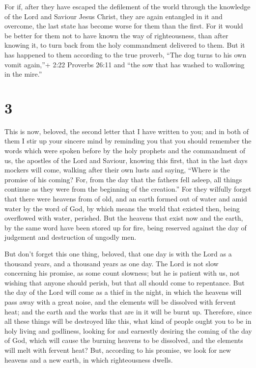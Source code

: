  For if, after they have escaped the defilement of the
world through the knowledge of the Lord and Saviour Jesus Christ, they
are again entangled in it and overcome, the last state has become worse
for them than the first.  For it would be better for them
not to have known the way of righteousness, than after knowing it, to
turn back from the holy commandment delivered to them.  But
it has happened to them according to the true proverb, ``The dog turns
to his own vomit again,''+ 2:22 Proverbs 26:11 and ``the sow that has
washed to wallowing in the mire.''

\hypertarget{section-2}{%
\section{3}\label{section-2}}

 This is now, beloved, the second letter that I have written
to you; and in both of them I stir up your sincere mind by reminding you
 that you should remember the words which were spoken before
by the holy prophets and the commandment of us, the apostles of the Lord
and Saviour,  knowing this first, that in the last days
mockers will come, walking after their own lusts  and
saying, ``Where is the promise of his coming? For, from the day that the
fathers fell asleep, all things continue as they were from the beginning
of the creation.''  For they wilfully forget that there were
heavens from of old, and an earth formed out of water and amid water by
the word of God,  by which means the world that existed
then, being overflowed with water, perished.  But the
heavens that exist now and the earth, by the same word have been stored
up for fire, being reserved against the day of judgement and destruction
of ungodly men.

 But don't forget this one thing, beloved, that one day is
with the Lord as a thousand years, and a thousand years as one day.
 The Lord is not slow concerning his promise, as some count
slowness; but he is patient with us, not wishing that anyone should
perish, but that all should come to repentance.  But the
day of the Lord will come as a thief in the night, in which the heavens
will pass away with a great noise, and the elements will be dissolved
with fervent heat; and the earth and the works that are in it will be
burnt up.  Therefore, since all these things will be
destroyed like this, what kind of people ought you to be in holy living
and godliness,  looking for and earnestly desiring the
coming of the day of God, which will cause the burning heavens to be
dissolved, and the elements will melt with fervent heat? 
But, according to his promise, we look for new heavens and a new earth,
in which righteousness dwells.

